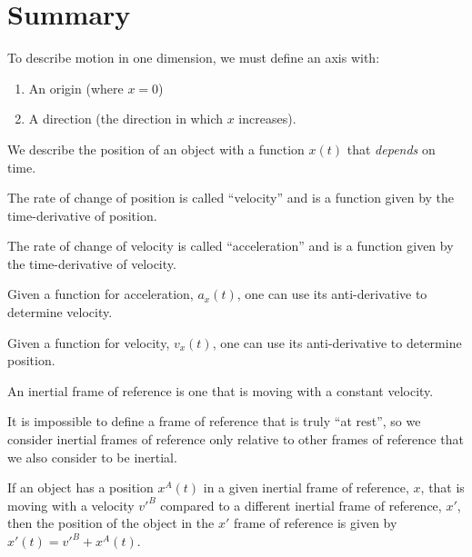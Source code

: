 \newpage
\section{Summary}
\vspace{1cm}
\begin{chapterSummary}
\item To describe motion in one dimension, we must define an axis with:
\begin{enumerate}
\item An origin (where $x=0$)
\item A direction (the direction in which $x$ increases).
\end{enumerate}
\item We describe the position of an object with a function $x(t)$ that \textit{depends} on time.
\item The rate of change of position is called ``velocity'' and is a function given by the time-derivative of position.
\item The rate of change of velocity is called ``acceleration'' and is a function given by the time-derivative of velocity.
\item Given a function for acceleration, $a_x(t)$, one can use its anti-derivative to determine velocity.
\item Given a function for velocity, $v_x(t)$, one can use its anti-derivative to determine position.
\item An inertial frame of reference is one that is moving with a constant velocity.
\item It is impossible to define a frame of reference that is truly ``at rest'', so we consider inertial frames of reference only relative to other frames of reference that we also consider to be inertial.
\item If an object has a position $x^A(t)$ in a given inertial frame of reference, $x$, that is moving with a velocity $v'^B$ compared to a different inertial frame of reference, $x'$, then the position of the object in the $x'$ frame of reference is given by $x'(t)=v'^B+x^A(t)$.
\end{chapterSummary}
